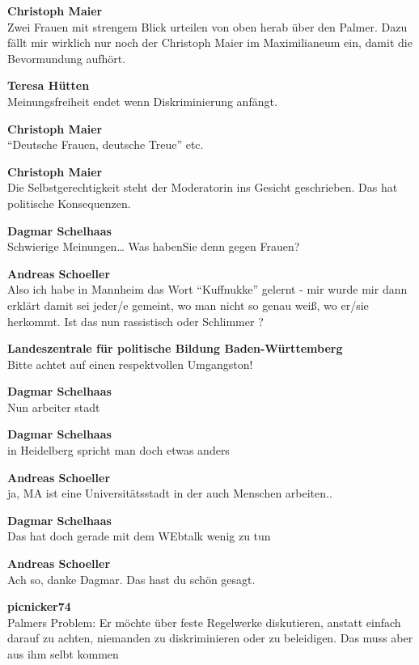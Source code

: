\documentclass[]{article}
\begin{document}
\textbf{Christoph Maier}\\
Zwei Frauen mit strengem Blick urteilen von oben herab über den Palmer.
Dazu fällt mir wirklich nur noch der
Christoph Maier\cite{christophmaiermdl} im
Maximilianeum\cite{maximilianeum} ein, damit die
Bevormundung aufhört.

\textbf{Teresa Hütten}\\
Meinungsfreiheit endet wenn Diskriminierung anfängt.

\textbf{Christoph Maier}\\
``Deutsche Frauen, deutsche
Treue'' etc.\cite{deutschefrauen}

\textbf{Christoph Maier}\\
Die Selbstgerechtigkeit steht der Moderatorin ins Gesicht geschrieben.
Das hat politische Konsequenzen.

\textbf{Dagmar Schelhaas}\\
Schwierige Meinungen\ldots{} Was habenSie denn gegen Frauen?

\textbf{Andreas Schoeller}\\
Also ich habe in Mannheim das Wort ``Kuffnukke'' gelernt - mir wurde
mir dann erklärt damit sei jeder/e gemeint, wo man nicht so genau weiß,
wo er/sie herkommt. Ist das nun rassistisch oder Schlimmer ?

\textbf{Landeszentrale für politische Bildung Baden-Württemberg}\\
Bitte achtet auf einen respektvollen Umgangston!

\textbf{Dagmar Schelhaas}\\
Nun arbeiter stadt

\textbf{Dagmar Schelhaas}\\
in Heidelberg spricht man doch etwas anders

\textbf{Andreas Schoeller}\\
ja, MA ist eine Universitätsstadt in der auch Menschen arbeiten..

\textbf{Dagmar Schelhaas}\\
Das hat doch gerade mit dem WEbtalk wenig zu tun

\textbf{Andreas Schoeller}\\
Ach so, danke Dagmar. Das hast du schön gesagt.

\textbf{picnicker74}\\
Palmers Problem: Er möchte über feste Regelwerke diskutieren, anstatt
einfach darauf zu achten, niemanden zu diskriminieren oder zu
beleidigen. Das muss aber aus ihm selbt kommen
\end{document}
